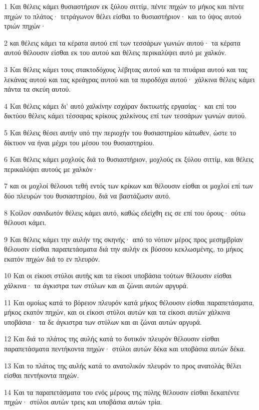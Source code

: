\par 1 Και θέλεις κάμει θυσιαστήριον εκ ξύλου σιττίμ, πέντε πηχών το μήκος και πέντε πηχών το πλάτος· τετράγωνον θέλει είσθαι το θυσιαστήριον· και το ύψος αυτού τριών πηχών·
\par 2 και θέλεις κάμει τα κέρατα αυτού επί των τεσσάρων γωνιών αυτού· τα κέρατα αυτού θέλουσιν είσθαι εκ του αυτού και θέλεις περικαλύψει αυτό με χαλκόν.
\par 3 Και θέλεις κάμει τους στακτοδόχους λέβητας αυτού και τα πτυάρια αυτού και τας λεκάνας αυτού και τας κρεάγρας αυτού και τα πυροδόχα αυτού· χάλκινα θέλεις κάμει πάντα τα σκεύη αυτού.
\par 4 Και θέλεις κάμει δι' αυτό χαλκίνην εσχάραν δικτυωτής εργασίας· και επί του δικτύου θέλεις κάμει τέσσαρας κρίκους χαλκίνους επί των τεσσάρων γωνιών αυτού.
\par 5 Και θέλεις θέσει αυτήν υπό την περιοχήν του θυσιαστηρίου κάτωθεν, ώστε το δίκτυον να ήναι μέχρι του μέσου του θυσιαστηρίου.
\par 6 Και θέλεις κάμει μοχλούς διά το θυσιαστήριον, μοχλούς εκ ξύλου σιττίμ, και θέλεις περικαλύψει αυτούς με χαλκόν·
\par 7 και οι μοχλοί θέλουσι τεθή εντός των κρίκων και θέλουσιν είσθαι οι μοχλοί επί των δύο πλευρών του θυσιαστηρίου, διά να βαστάζωσιν αυτό.
\par 8 Κοίλον σανιδωτόν θέλεις κάμει αυτό, καθώς εδείχθη εις σε επί του όρους· ούτω θέλουσι κάμει.
\par 9 Και θέλεις κάμει την αυλήν της σκηνής· από το νότιον μέρος προς μεσημβρίαν θέλουσιν είσθαι παραπετάσματα διά την αυλήν εκ βύσσου κεκλωσμένης, το μήκος εκατόν πηχών διά το εν πλευρόν.
\par 10 Και οι είκοσι στύλοι αυτής και τα είκοσι υποβάσια τούτων θέλουσιν είσθαι χάλκινα· τα άγκιστρα των στύλων και αι ζώναι αυτών αργυρά.
\par 11 Και ομοίως κατά το βόρειον πλευρόν κατά μήκος θέλουσιν είσθαι παραπετάσματα, μήκος εκατόν πηχών, και οι είκοσι στύλοι αυτών και τα είκοσι αυτών χάλκινα υποβάσια· τα δε άγκιστρα των στύλων και αι ζώναι αυτών αργυρά.
\par 12 Και διά το πλάτος της αυλής κατά το δυτικόν πλευρόν θέλουσιν είσθαι παραπετάσματα πεντήκοντα πηχών· στύλοι αυτών δέκα και υποβάσια αυτών δέκα.
\par 13 Και το πλάτος της αυλής κατά το ανατολικόν πλευρόν το προς ανατολάς θέλει είσθαι πεντήκοντα πηχών.
\par 14 Και τα παραπετάσματα του ενός μέρους της πύλης θέλουσιν είσθαι δεκαπέντε πηχών· στύλοι αυτών τρεις και υποβάσια αυτών τρία.
